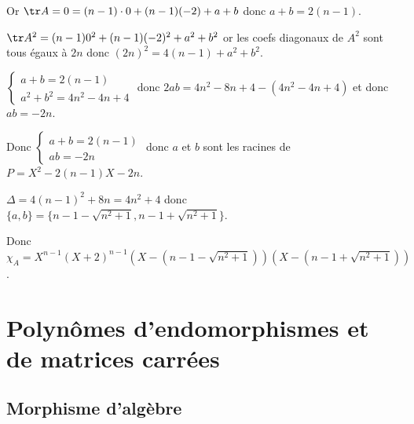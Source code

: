 \begin{exemple}
        Or $\tr A = 0 = (n - 1) \cdot 0 + (n - 1)(-2) + a + b$ donc $a + b = 2(n - 1)$.

        $\tr A^2 = (n - 1) 0^2 + (n - 1)(-2)^2 + a^2 + b^2$ 
        or les coefs diagonaux de $A^2$ sont tous égaux à $2n$ donc 
        $(2n)^2 = 4(n - 1) + a^2 + b^2$.

        $\begin{cases}
            a + b = 2(n - 1) \\
            a^2 + b^2 = 4n^2 - 4n + 4
        \end{cases}$ donc $2ab = 4n^2 - 8n + 4 - (4n^2 - 4n + 4)$ et 
        donc $ab = -2n$. 

        Donc $\begin{cases}
            a + b = 2(n - 1) \\
            ab = -2n
        \end{cases}$ donc $a$ et $b$ sont les racines de $P = X^2 - 2(n - 1)X - 2n$.

        $\Delta = 4(n - 1)^2 + 8 n = 4n^2 + 4$ donc 
        $\{a, b\} = \{n - 1 - \sqrt{n^2 + 1}, n - 1 + \sqrt{n^2 + 1}\}$.

        Donc $\chi_A = X^{n -1} (X + 2)^{n - 1} (X - (n - 1 - \sqrt{n^2 + 1}))(X - (n - 1 + \sqrt{n^2 + 1}))$.
\end{exemple}

\section{Polynômes d'endomorphismes et de matrices carrées}
\subsection{Morphisme d'algèbre }

